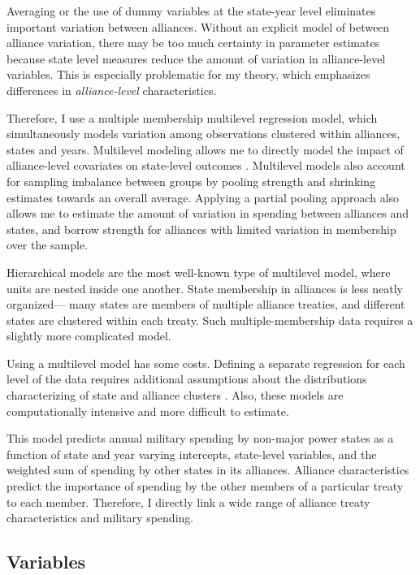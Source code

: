\documentclass[12pt]{article}
\begin{document}
Averaging or the use of dummy variables at the state-year level eliminates important variation between alliances. Without an explicit model of between alliance variation, there may be too much certainty in parameter estimates \citep{McElreath2016} because state level measures reduce the amount of variation in alliance-level variables. This is especially problematic for my theory, which emphasizes differences in \textit{alliance-level} characteristics. 

Therefore, I use a multiple membership multilevel regression model, which simultaneously models variation among observations clustered within alliances, states and years. Multilevel modeling allows me to directly model the impact of alliance-level covariates on state-level outcomes \citep{GelmanHill2007}. Multilevel models also account for sampling imbalance between groups by pooling strength and shrinking estimates towards an overall average. Applying a partial pooling approach also allows me to estimate the amount of variation in spending between alliances and states, and borrow strength for alliances with limited variation in membership over the sample. 

Hierarchical models are the most well-known type of multilevel model, where units are nested inside one another. State membership in alliances is less neatly organized--- many states are members of multiple alliance treaties, and different states are clustered within each treaty. Such multiple-membership data requires a slightly more complicated model. 

Using a multilevel model has some costs. Defining a separate regression for each level of the data requires additional assumptions about the distributions characterizing of state and alliance clusters \citep{McElreath2016}. Also, these models are computationally intensive and more difficult to estimate.

This model predicts annual military spending by non-major power states as a function of state and year varying intercepts, state-level variables, and the weighted sum of spending by other states in its alliances. Alliance characteristics predict the importance of spending by the other members of a particular treaty to each member. Therefore, I directly link a wide range of alliance treaty characteristics and military spending. 

\subsection*{Variables} 
\end{document}
